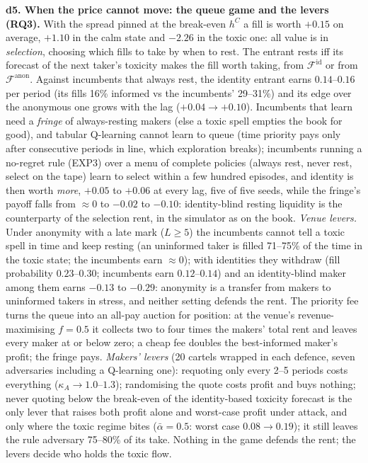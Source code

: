 \documentclass[10pt]{article}
\newcommand{\Fanon}{\mathcal{F}^{\mathrm{anon}}}
\newcommand{\Fid}{\mathcal{F}^{\mathrm{id}}}
\begin{document}
\textbf{d5. When the price cannot move: the queue game and the levers (RQ3).} With the spread pinned at the break-even $h^C$ a fill is worth $+0.15$ on average, $+1.10$ in the calm state and $-2.26$ in the toxic one: all value is in \emph{selection}, choosing which fills to take by when to rest. The entrant rests iff its forecast of the next taker's toxicity makes the fill worth taking, from $\Fid$ or from $\Fanon$. Against incumbents that always rest, the identity entrant earns $0.14$--$0.16$ per period (its fills 16\% informed vs the incumbents' 29--31\%) and its edge over the anonymous one grows with the lag ($+0.04\to+0.10$). Incumbents that learn need a \emph{fringe} of always-resting makers (else a toxic spell empties the book for good), and tabular Q-learning cannot learn to queue (time priority pays only after consecutive periods in line, which exploration breaks); incumbents running a no-regret rule (EXP3) over a menu of complete policies (always rest, never rest, select on the tape) learn to select within a few hundred episodes, and identity is then worth \emph{more}, $+0.05$ to $+0.06$ at every lag, five of five seeds, while the fringe's payoff falls from $\approx0$ to $-0.02$ to $-0.10$: identity-blind resting liquidity is the counterparty of the selection rent, in the simulator as on the book. \emph{Venue levers.} Under anonymity with a late mark ($L\ge5$) the incumbents cannot tell a toxic spell in time and keep resting (an uninformed taker is filled 71--75\% of the time in the toxic state; the incumbents earn $\approx0$); with identities they withdraw (fill probability $0.23$--$0.30$; incumbents earn $0.12$--$0.14$) and an identity-blind maker among them earns $-0.13$ to $-0.29$: anonymity is a transfer from makers to uninformed takers in stress, and neither setting defends the rent. The priority fee turns the queue into an all-pay auction for position: at the venue's revenue-maximising $f=0.5$ it collects two to four times the makers' total rent and leaves every maker at or below zero; a cheap fee doubles the best-informed maker's profit; the fringe pays. \emph{Makers' levers} (20 cartels wrapped in each defence, seven adversaries including a Q-learning one): requoting only every 2--5 periods costs everything ($\kappa_A\to1.0$--$1.3$); randomising the quote costs profit and buys nothing; never quoting below the break-even of the identity-based toxicity forecast is the only lever that raises both profit alone and worst-case profit under attack, and only where the toxic regime bites ($\bar\alpha=0.5$: worst case $0.08\to0.19$); it still leaves the rule adversary 75--80\% of its take. Nothing in the game defends the rent; the levers decide who holds the toxic flow.
\end{document}
